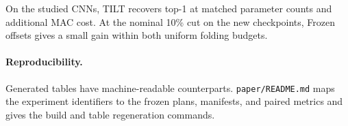 \documentclass[11pt,a4paper]{article}
\newcommand{\Tilt}{TILT}
\newcommand{\FrozenShort}{Frozen offsets}
\begin{document}
On the studied CNNs, \Tilt{} recovers top-1 at matched parameter counts
and additional MAC cost. At the nominal 10\% cut on the new checkpoints,
\FrozenShort{} gives a small gain within both uniform folding budgets.

\paragraph{Reproducibility.}
Generated tables have machine-readable counterparts.
\texttt{paper/README.md} maps the experiment identifiers to the frozen
plans, manifests, and paired metrics and gives the build and table
regeneration commands.

\begingroup
\small
\raggedright
\setlength{\bibsep}{2pt}


\endgroup

\clearpage
\appendix
\setcounter{table}{0}
\setcounter{figure}{0}
\renewcommand{\thetable}{S\arabic{table}}
\renewcommand{\thefigure}{S\arabic{figure}}
\renewcommand{\theHtable}{supp.\arabic{table}}
\renewcommand{\theHfigure}{supp.\arabic{figure}}

\end{document}
